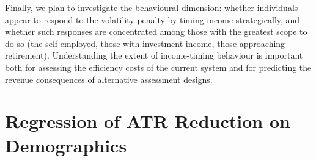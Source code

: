 \documentclass[12pt,a4paper]{article}
\begin{document}
Finally, we plan to investigate the behavioural dimension: whether individuals appear to respond to the volatility penalty by timing income strategically, and whether such responses are concentrated among those with the greatest scope to do so (the self-employed, those with investment income, those approaching retirement). Understanding the extent of income-timing behaviour is important both for assessing the efficiency costs of the current system and for predicting the revenue consequences of alternative assessment designs.

\newpage
\appendix
\section{Regression of ATR Reduction on Demographics}
\end{document}
